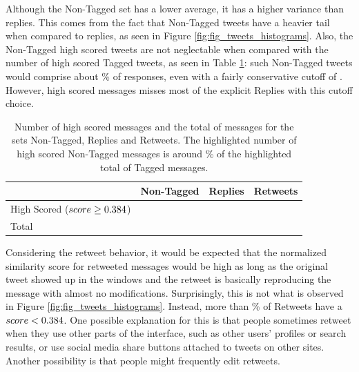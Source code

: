 Although the Non-Tagged set has a lower average, it has a higher variance than replies. This comes from the fact that Non-Tagged tweets have a heavier tail when compared to replies, as seen in Figure \ref{fig:fig_tweets_histograms}. Also, the Non-Tagged high scored tweets are not neglectable when compared with the number of high scored Tagged tweets, as seen in Table \ref{tab:highScoredCounts}: such Non-Tagged tweets would comprise about \highNonTaggedTweetCountPct{}\% of responses, even with a fairly conservative cutoff of \thresholdScore{}. However, high scored messages misses most of the explicit Replies with this cutoff choice.

\begin{table}[!tb]
	\centering
	\fontsize{9pt}{11pt}\selectfont
		\caption{Number of high scored messages and the total of messages for the sets Non-Tagged, Replies and Retweets. The highlighted number of high scored Non-Tagged messages is around \highNonTaggedTweetCountPct{}\% of the highlighted total of Tagged messages.}
		\begin{tabular}{l|>{\centering\arraybackslash}m{1.6cm}|>{\centering\arraybackslash}m{1cm}|>{\centering\arraybackslash}m{1.1cm}|}
			\cline{2-4}
			& Non-Tagged & Replies & Retweets \\ \hline
			\multicolumn{1}{|p{2.2cm}|}{\parbox[top][22pt][c]{2.2cm}{High Scored\\($score \geq 0.384{}$)}} & 
			\cellcolor{gray!25} \highNonTaggedTweetCount{} & \highRepliesTweetCount{} & \highRetweetsTweetCount{} \\ \hline
			\multicolumn{1}{|p{2.2cm}|}{Total} & 
			\totalNonTaggedTweetCount{} & \cellcolor{gray!25} \totalReplies{} & \cellcolor{gray!25} \totalRetweets{} \\ \hline
		\end{tabular}
	\label{tab:highScoredCounts}
\end{table}

Considering the retweet behavior, it would be expected that the normalized similarity score for retweeted messages would be high as long as the original tweet showed up in the windows and the retweet is basically reproducing the message with almost no modifications. 
Surprisingly, this is not what is observed in Figure \ref{fig:fig_tweets_histograms}.  Instead, more than \lowRetweetCountPct{}\% of Retweets have a $score < 0.384{}$.  One possible explanation for this is that people sometimes retweet when they use other parts of the interface, such as other users' profiles or search results, or use social media share buttons attached to tweets on other sites.  Another possibility is that people might frequently edit retweets.

